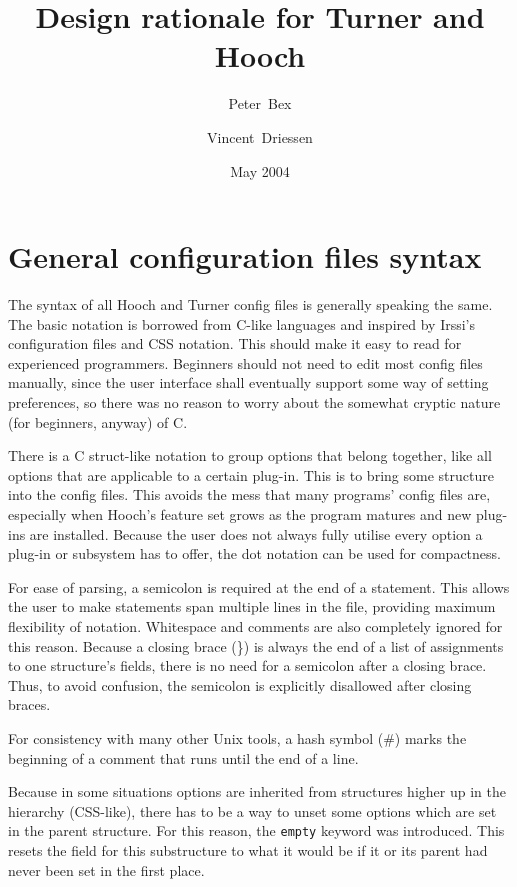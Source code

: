 \documentclass[a4paper]{article}
\title{Design rationale for Turner and Hooch}
\date{May 2004}
\author{Peter~Bex\and{}Vincent~Driessen}
\begin{document}
\maketitle

\section{General configuration files syntax}

The syntax of all Hooch and Turner config files is generally speaking the same.
The basic notation is borrowed from C-like languages and inspired by
Irssi's configuration files and CSS notation.  This should make it easy
to read for experienced programmers.  Beginners should not need to edit
most config files manually, since the user interface shall eventually
support some way of setting preferences, so there was no reason to worry
about the somewhat cryptic nature (for beginners, anyway) of C.

There is a C struct-like notation to group options that belong together,
like all options that are applicable to a certain plug-in.  This is to
bring some structure into the config files.  This avoids the mess that
many programs' config files are, especially when Hooch's feature set grows
as the program matures and new plug-ins are installed.
Because the user does not always fully utilise every option a plug-in or
subsystem has to offer, the dot notation can be used for compactness.

For ease of parsing, a semicolon is required at the end of a statement.
This allows the user to make statements span multiple lines in the file,
providing maximum flexibility of notation.  Whitespace and comments are
also completely ignored for this reason.  Because a closing brace (\}) is
always the end of a list of assignments to one structure's fields, there
is no need for a semicolon after a closing brace.  Thus, to avoid confusion,
the semicolon is explicitly disallowed after closing braces.

For consistency with many other Unix tools, a hash symbol (\#) marks the
beginning of a comment that runs until the end of a line.

Because in some situations options are inherited from structures higher
up in the hierarchy (CSS-like), there has to be a way to unset some
options which are set in the parent structure.  For this reason, the
\texttt{empty} keyword was introduced.  This resets the field for this
substructure to what it would be if it or its parent had never been set
in the first place.
\end{document}
